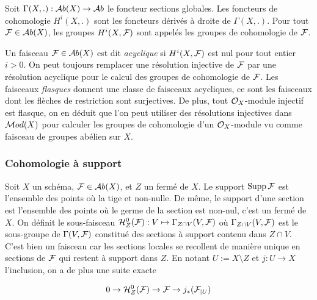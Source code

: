 \begin{defn}
Soit $\Gamma(X,.):\mathcal{A} b(X)\rightarrow \mathcal{A} b$ le foncteur sections globales. Les foncteurs de cohomologie $H^i(X,.)$ sont les foncteurs dérivés à droite de $\Gamma(X,.)$. Pour tout $\mathcal{F}\in \mathcal{A} b(X)$, les groupes $H^i(X,\mathcal{F})$ sont appelés les groupes de cohomologie de $\mathcal{F}$.
\end{defn}


Un faisceau $\mathcal{F}\in \mathcal{A} b(X)$ est dit \textit{acyclique} si $H^i(X,\mathcal{F})$ est nul pour tout entier $i>0$. On peut toujours remplacer une résolution injective de $\mathcal{F}$ par une résolution acyclique pour le calcul des groupes de cohomologie de $\mathcal{F}$. Les faisceaux \textit{flasques} donnent une classe de faisceaux acycliques, ce sont les faisceaux dont les flèches de restriction sont surjectives. De plus, tout $\mathcal{O}_X$-module injectif est flasque, on en déduit que l'on peut utiliser des résolutions injectives dans $\mathcal{M} od(X)$ pour calculer les groupes de cohomologie d'un $\mathcal{O}_X$-module vu comme faisceau de groupes abélien sur $X$.

\subsubsection{Cohomologie à support}

Soit $X$ un schéma, $\mathcal{F}\in \mathcal{A} b(X)$, et $Z$ un fermé de $X$. Le support $\operatorname{Supp}\mathcal{F}$ est l'ensemble des points où la tige et non-nulle. De même, le support d'une section est l'ensemble des points où le germe de la section est non-nul, c'est un fermé de $X$. On définit le sous-faisceau $\mathcal{H} ^0 _Z(\mathcal{F}):V\mapsto \Gamma_{Z\cap V}(V,\mathcal{F})$ où $\Gamma_{Z\cap V}(V,\mathcal{F})$ est le sous-groupe de $\Gamma(V,\mathcal{F})$ constitué des sections à support contenu dans $Z\cap V$. C'est bien un faisceau car les sections locales se recollent de manière unique en sections de $\mathcal{F}$ qui restent à support dans $Z$. En notant $U:=X\setminus Z$ et $j:U\rightarrow X$ l'inclusion, on a de plus une suite exacte

\begin{equation}\label{eq:ESSupport}
0\rightarrow \mathcal{H}^0 _Z(\mathcal{F}) \rightarrow \mathcal{F} \rightarrow j_*(\mathcal{F}_{|U})
\end{equation}

